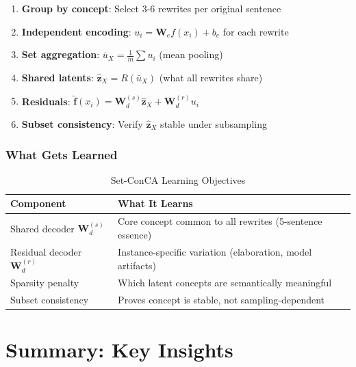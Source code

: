 \documentclass[12pt,a4paper]{report}
\begin{document}
\begin{enumerate}
    \item \textbf{Group by concept}: Select 3-6 rewrites per original sentence
    \item \textbf{Independent encoding}: $u_i = \mathbf{W}_e f(x_i) + b_e$ for each rewrite
    \item \textbf{Set aggregation}: $\bar{u}_X = \frac{1}{m}\sum u_i$ (mean pooling)
    \item \textbf{Shared latents}: $\hat{\mathbf{z}}_X = R(\bar{u}_X)$ (what all rewrites share)
    \item \textbf{Residuals}: $\hat{\mathbf{f}}(x_i) = \mathbf{W}^{(s)}_d \hat{\mathbf{z}}_X + \mathbf{W}^{(r)}_d u_i$
    \item \textbf{Subset consistency}: Verify $\hat{\mathbf{z}}_X$ stable under subsampling
\end{enumerate}

\subsection{What Gets Learned}

\begin{table}[H]
\centering
\begin{tabular}{p{4cm}p{7cm}}
\toprule
\textbf{Component} & \textbf{What It Learns} \\
\midrule
Shared decoder $\mathbf{W}^{(s)}_d$ & Core concept common to all rewrites (5-sentence essence) \\
Residual decoder $\mathbf{W}^{(r)}_d$ & Instance-specific variation (elaboration, model artifacts) \\
Sparsity penalty & Which latent concepts are semantically meaningful \\
Subset consistency & Proves concept is stable, not sampling-dependent \\
\bottomrule
\end{tabular}
\caption{Set-ConCA Learning Objectives}
\end{table}

\newpage

\chapter{Summary: Key Insights}
\end{document}
